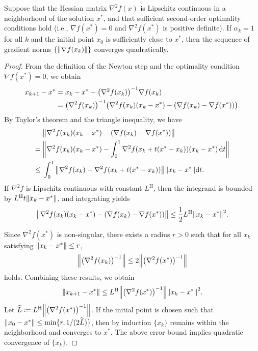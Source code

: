 \documentclass[0_en]{subfiles}
\begin{document}
\begin{theorem}
    \label{thm:newton-quadratic}
    Suppose that the Hessian matrix $\nabla^2 f(x)$ is Lipschitz continuous in a neighborhood of the solution $x^*$, and that sufficient second-order optimality conditions hold (i.e., $\nabla f(x^*)=0$ and $\nabla^2 f(x^*)$ is positive definite).
    If $\alpha_k=1$ for all $k$ and the initial point $x_0$ is sufficiently close to $x^*$,
    then the sequence of gradient norms $\{\norm{\nabla f(x_k)}\}$ converges quadratically.
\end{theorem}
\begin{proof}
    From the definition of the Newton step and the optimality condition $\nabla f(x^*)=0$, we obtain
    \begin{align*}
        x_{k+1} - x^*
         & = x_k - x^* - \qty(\nabla^2 f(x_k))^{-1}\nabla f(x_k)                                          \\
         & = \qty(\nabla^2 f(x_k))^{-1} \qty(\nabla^2 f(x_k)(x_k-x^*)-\qty(\nabla f(x_k)-\nabla f(x^*))).
    \end{align*}
    By Taylor's theorem and the triangle inequality, we have
    \begin{align*}
                & \norm{\nabla^2 f(x_k)(x_k-x^*)-\qty(\nabla f(x_k)-\nabla f(x^*))}                     \\
        =   {}  & \norm{\nabla^2 f(x_k)(x_k-x^*)-\int_0^1 \nabla^2 f(x_k+t(x^*-x_k)) (x_k - x^*)\dd{t}} \\
        \leq {} & \int_0^1 \norm{\nabla^2 f(x_k)-\nabla^2 f(x_k+t(x^*-x_k))}\norm{x_k-x^*}\dd t.
    \end{align*}
    If $\nabla^2 f$ is Lipschitz continuous with constant $L^{\mathrm{H}}$, then the integrand is bounded by $L^{\mathrm{H}}t\norm{x_k-x^*}$, and integrating yields
    \begin{equation*}
        \norm{\nabla^2 f(x_k)(x_k-x^*)-\qty(\nabla f(x_k)-\nabla f(x^*))}
        \le \frac{1}{2}L^{\mathrm{H}}\norm{x_k-x^*}^2.
    \end{equation*}

    Since $\nabla^2 f(x^*)$ is non-singular, there exists a radius $r>0$ such that for all $x_k$ satisfying $\norm{x_k-x^*}\le r$,
    \[
        \norm{\qty(\nabla^2 f(x_k))^{-1}}\le 2\norm{\qty(\nabla^2 f(x^*))^{-1}}
    \]
    holds.
    Combining these results, we obtain
    \begin{equation*}
        \norm{x_{k+1} - x^*}
        \le L^{\mathrm{H}}\norm{\qty(\nabla^2 f(x^*))^{-1}} \norm{x_k-x^*}^2.
    \end{equation*}
    Let $\widetilde L  \coloneqq  L^{\mathrm{H}}\norm{\qty(\nabla^2 f(x^*))^{-1}}$.
    If the initial point is chosen such that $\norm{x_0-x^*}\le \min\{r,1/(2\widetilde L)\}$, then by induction $\{x_k\}$ remains within the neighborhood and converges to $x^*$.
    The above error bound implies quadratic convergence of $\{x_k\}$.


\end{proof}
\end{document}
